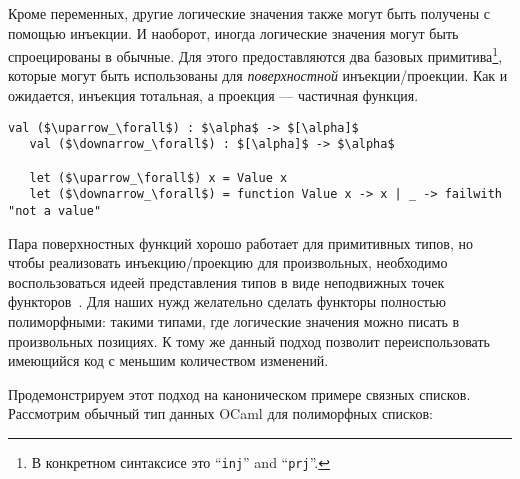 Кроме переменных, другие логические значения также могут быть получены с помощью инъекции.
И наоборот, иногда логические значения могут быть спроецированы в обычные.
Для этого предоставляются два базовых примитива\footnote{В конкретном синтаксисе это \enquote{\lstinline|inj|} and \enquote{\lstinline|prj|}.},
которые могут быть использованы для \emph{поверхностной} инъекции/проекции. Как и ожидается, инъекция тотальная, а проекция --- частичная функция.


\begin{lstlisting}[mathescape=true]
   val ($\uparrow_\forall$) : $\alpha$ -> $[\alpha]$
   val ($\downarrow_\forall$) : $[\alpha]$ -> $\alpha$

   let ($\uparrow_\forall$) x = Value x
   let ($\downarrow_\forall$) = function Value x -> x | _ -> failwith "not a value"
\end{lstlisting}


Пара поверхностных функций хорошо работает для примитивных типов, но чтобы реализовать инъекцию/проекцию для произвольных, необходимо воспользоваться
идеей представления типов в виде неподвижных точек функторов~\cite{ALaCarte}.
Для наших нужд желательно сделать функторы полностью полиморфными: такими типами, где логические значения можно писать в произвольных позициях.
К тому же данный подход позволит переиспользовать имеющийся код с меньшим количеством изменений.


Продемонстрируем этот подход на каноническом примере связных списков. Рассмотрим обычный тип данных OCaml для полиморфных списков:


